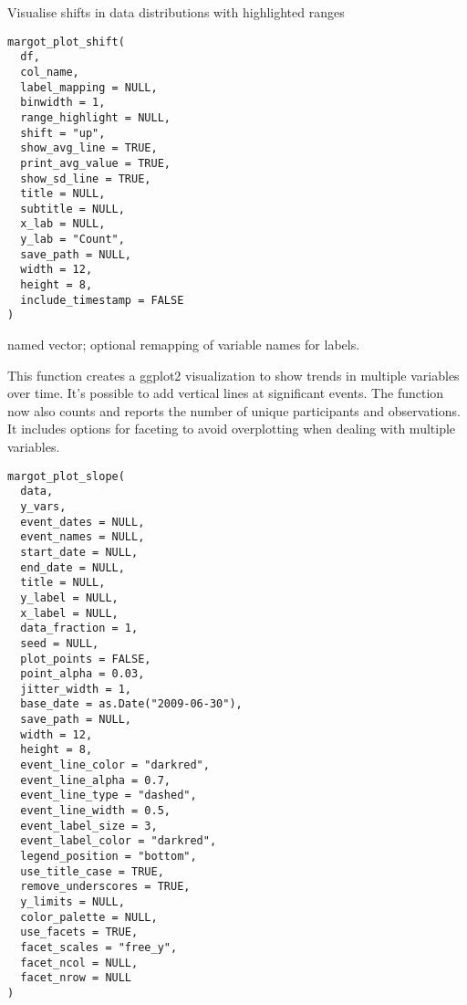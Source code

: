 \documentclass[a4paper]{book}
\begin{document}
%
\begin{Description}
Visualise shifts in data distributions with highlighted ranges
\end{Description}
%
\begin{Usage}
\begin{verbatim}
margot_plot_shift(
  df,
  col_name,
  label_mapping = NULL,
  binwidth = 1,
  range_highlight = NULL,
  shift = "up",
  show_avg_line = TRUE,
  print_avg_value = TRUE,
  show_sd_line = TRUE,
  title = NULL,
  subtitle = NULL,
  x_lab = NULL,
  y_lab = "Count",
  save_path = NULL,
  width = 12,
  height = 8,
  include_timestamp = FALSE
)
\end{verbatim}
\end{Usage}
%
\begin{Arguments}
\begin{ldescription}
\item[\code{label\_mapping}] named vector; optional remapping of variable names for labels.
\end{ldescription}
\end{Arguments}
%
\begin{Description}
This function creates a ggplot2 visualization to show trends in multiple variables over time.
It's possible to add vertical lines at significant events. The function now also counts and
reports the number of unique participants and observations. It includes options for faceting
to avoid overplotting when dealing with multiple variables.
\end{Description}
%
\begin{Usage}
\begin{verbatim}
margot_plot_slope(
  data,
  y_vars,
  event_dates = NULL,
  event_names = NULL,
  start_date = NULL,
  end_date = NULL,
  title = NULL,
  y_label = NULL,
  x_label = NULL,
  data_fraction = 1,
  seed = NULL,
  plot_points = FALSE,
  point_alpha = 0.03,
  jitter_width = 1,
  base_date = as.Date("2009-06-30"),
  save_path = NULL,
  width = 12,
  height = 8,
  event_line_color = "darkred",
  event_line_alpha = 0.7,
  event_line_type = "dashed",
  event_line_width = 0.5,
  event_label_size = 3,
  event_label_color = "darkred",
  legend_position = "bottom",
  use_title_case = TRUE,
  remove_underscores = TRUE,
  y_limits = NULL,
  color_palette = NULL,
  use_facets = TRUE,
  facet_scales = "free_y",
  facet_ncol = NULL,
  facet_nrow = NULL
)
\end{verbatim}
\end{Usage}
\end{document}

